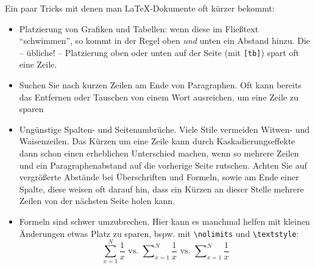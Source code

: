 Ein paar Tricks mit denen man \LaTeX{}-Dokumente oft kürzer bekommt:
\begin{itemize}
\item Platzierung von Grafiken und Tabellen: wenn diese im Fließtext \enquote{schwimmen},
so kommt in der Regel oben \emph{und} unten ein Abstand hinzu.
Die -- übliche! -- Platzierung oben oder unten auf der Seite (mit \texttt{[tb]})
spart oft eine Zeile.
\item Suchen Sie nach kurzen Zeilen am Ende von Paragraphen.
Oft kann bereits das Entfernen oder Tauschen von einem Wort ausreichen, um eine Zeile zu sparen
\item Ungünstige Spalten- und Seitenumbrüche. Viele Stile vermeiden Witwen- und Waisenzeilen.
Das Kürzen um eine Zeile kann durch Kaskadierungseffekte dann schon einen erheblichen Unterschied
machen, wenn so mehrere Zeilen und ein Paragraphenabstand auf die vorherige Seite rutschen.
Achten Sie auf vergrößerte Abstände bei Überschriften und Formeln, sowie am Ende einer Spalte,
diese weisen oft darauf hin, dass ein Kürzen an dieser Stelle mehrere Zeilen
von der nächsten Seite holen kann.
\item Formeln sind schwer umzubrechen. Hier kann es manchmal helfen mit kleinen Änderungen
etwas Platz zu sparen, bspw.{} mit \texttt{\textbackslash{}nolimits} und \texttt{\textbackslash{}textstyle}:
$$
\sum_{x=1}^N \frac{1}{x} \text{ vs. } \sum\nolimits_{x=1}^N \frac{1}{x} \text{ vs. } \textstyle\sum\nolimits_{x=1}^N \frac{1}{x}
$$
\end{itemize}
